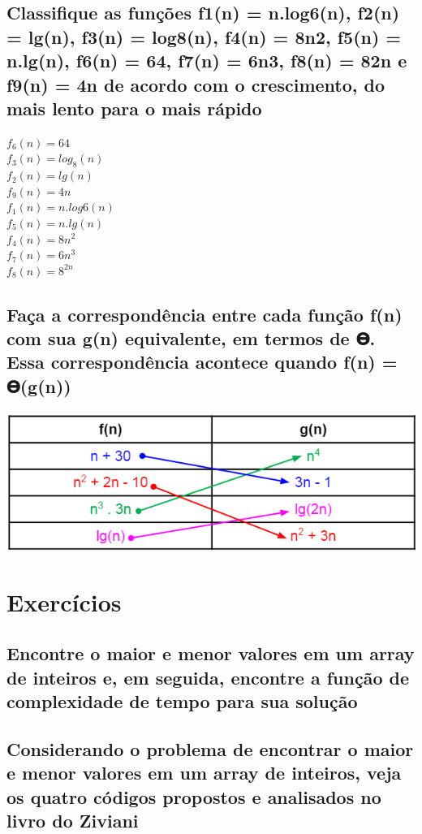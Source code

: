 \documentclass[12pt]{article}
\begin{document}
{\subsection{Classifique as funções f1(n) = n.log6(n), f2(n) = lg(n), f3(n) = log8(n), f4(n) = 8n2, f5(n) = n.lg(n), f6(n) = 64, f7(n) = 6n3, f8(n) = 82n e f9(n) = 4n de acordo com o crescimento, do mais lento para o mais rápido}
$f_{6}(n) = 64$
\\$f_{3}(n) = log_{8}(n)$
\\$f_{2}(n) = lg(n)$
\\$f_{9}(n) = 4n$
\\$f_{1}(n) = n.log6(n)$
\\$f_{5}(n) = n.lg(n)$
\\$f_{4}(n) = 8n^2$
\\$f_{7}(n) = 6n^3$
\\$f_{8}(n) = 8^{2n}$

\subsection{Faça a correspondência entre cada função f(n) com sua g(n) equivalente, em termos de 𝚯. Essa correspondência acontece quando f(n) = 𝚯(g(n))}
\includegraphics{images/exercicio_19.png}

\section{Exercícios}
\subsection{Encontre o maior e menor valores em um array de inteiros e, em seguida, encontre a função de complexidade de tempo para sua solução}

\subsection{Considerando o problema de encontrar o maior e menor valores em um array de inteiros, veja os quatro códigos propostos e analisados no livro do Ziviani}

}
\end{document}
